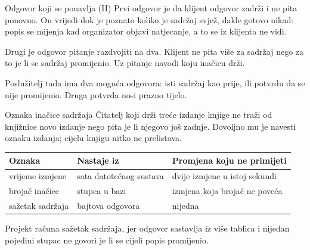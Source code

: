 \begin{frame}{Odgovor koji se ponavlja (II)}
Prvi odgovor je da klijent odgovor zadrži i ne pita ponovno. On vrijedi dok je poznato koliko je sadržaj svjež, dakle gotovo nikad: popis se mijenja kad organizator objavi natjecanje, a to se iz klijenta ne vidi.

\vspace{0.9em}
Drugi je odgovor pitanje razdvojiti na dva. Klijent ne pita više za sadržaj nego za to je li se sadržaj promijenio. Uz pitanje navodi koju inačicu drži.

\vspace{0.9em}
Poslužitelj tada ima dva moguća odgovora: isti sadržaj kao prije, ili potvrdu da se nije promijenio. Druga potvrda nosi prazno tijelo.
\end{frame}


\begin{frame}{Oznaka inačice sadržaja}
Čitatelj koji drži treće izdanje knjige ne traži od knjižnice novo izdanje nego pita je li njegovo još zadnje. Dovoljno mu je navesti oznaku izdanja; cijelu knjigu nitko ne prelistava.

\vspace{0.7em}
\begin{center}
{\small
\setlength{\tabcolsep}{6pt}
\renewcommand{\arraystretch}{1.3}
\begin{tabular}{@{}L{3.1cm}L{3.9cm}L{4.3cm}@{}}
  \toprule
  \textbf{Oznaka} & \textbf{Nastaje iz} & \textbf{Promjena koju ne primijeti} \\
  \midrule
  vrijeme izmjene & sata datotečnog sustava & dvije izmjene u istoj sekundi \\
  brojač inačice & stupca u bazi & izmjena koja brojač ne poveća \\
  sažetak sadržaja & bajtova odgovora & nijedna \\
  \bottomrule
\end{tabular}
}
\end{center}

\vspace{0.6em}
Projekt računa sažetak sadržaja, jer odgovor sastavlja iz više tablica i nijedan pojedini stupac ne govori je li se cijeli popis promijenio.
\end{frame}

